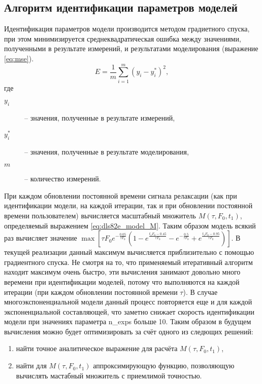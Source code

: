 	\subsection{Алгоритм идентификации параметров моделей}
	Идентификация параметров модели производится методом градиетного 
	спуска, при этом минимизируется среднеквадратическая ошибка между 
	значениями, полученными в результате измерений, и результатами 
	моделирования (выражение \ref{eq:mse}).
	\begin{equation}
		\label{eq:mse}
		E = \frac{1}{m}\sum_{i=1}^{m}\left(y_i - y_i^*\right)^2,
	\end{equation}
	где
	\begin{description}
		\item[$y_i$] -- значения, полученные в результате измерений,
		\item[$y_i^*$] -- значения, полученные в результате моделирования,
		\item[$m$] -- количество измерений.
	\end{description}
	При каждом обновлении постоянной времени сигнала релаксации (как при 
	идентификации модели, на каждой итерации, так и при обновлении постоянной 
	времени пользователем) вычисляется масштабный множитель $M(\tau, F_0, t_1)$, 
	определяемый выражением \ref{eq:dls82e_model_M}. Таким образом модель 
	всякий раз вычисляет значение 	
	\(
		\max{\left[
	    \tau F_0 e^{-\frac{0.05}{\tau F_0}}
	    \left(1-e^{\frac{t_1 F_0-0.45}{\tau F_0}}
	    -e^{-\frac{0.5}{\tau F_0}}+
	    e^{\frac{t_1 F_0-0.95}{\tau F_0}}\right)
	    \right]}
    \).
    В текущей реализации данный максимум вычисляется приблизительно
    с помощью градиентного спуска. Не смотря на то, что применяемый итеративный
    алгоритм находит максимум очень быстро, эти вычисления занимают довольно 
    много веремени при идентификации моделей, потому что выполняются на 
    каждой итерации (при каждом обновлении постоянной времени $\tau$). В случае 
    многоэкспоненциальной модели данный процесс повторяется еще и для каждой 
    экспоненциальной составляющей, что заметно снижает скорость идентификации 
    модели при значениях параметра n\_exps больше 10. Таким образом в будущем 
    вычисления можно будет оптимизировать за счёт одного из следющих решений:
    \begin{enumerate}
    	\item найти точное аналитическое выражение для расчёта 
    	$M(\tau, F_0, t_1)$,
    	\item найти для $M(\tau, F_0, t_1)$ аппроксимирующую функцию, 
    	позволяющую вычислять мастабный множитель с приемлимой точностью.
    \end{enumerate}

